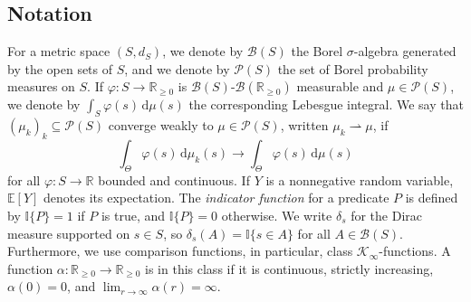 \documentclass[letterpaper, 10 pt, conference]{IEEEconf}  %
\newcommand{\R}{\mathbb{R}} %
\newcommand{\Rnn}{\mathbb{R}_{\geq 0}} %
\newcommand{\Indicator}[1]{\mathbb{I}\{{#1}\}}
\newcommand{\Borel}{\mathcal{B}} %
\newcommand{\Pbs}{\mathcal{P}} %
\newcommand{\E}{\mathbb{E}} %
\newcommand{\diff}{\, \mathrm{d}} %
\newcommand{\cKi}{\mathcal{K}_\infty} %
\theoremstyle{theorem}
\theoremstyle{definition}
\theoremstyle{remark}
\begin{document}
\subsection{Notation}
For a metric space $(S,d_S)$, we denote by $\Borel(S)$ the Borel $\sigma$-algebra generated by the open sets of $S$,
and we denote by $\Pbs(S)$ the set of Borel probability measures on $S$.
If $\varphi \colon S \rightarrow \Rnn$ is $\Borel(S)$-$\Borel(\Rnn)$ measurable and $\mu \in \Pbs(S)$, we denote by $\int_S \varphi(s) \diff \mu(s)$ the corresponding Lebesgue integral.
We say that $(\mu_k)_k\subseteq\Pbs(S)$ converge weakly to $\mu\in\Pbs(S)$, written $\mu_k \rightharpoonup \mu$, if
\begin{equation*}
    \int_\Theta \varphi(s) \diff \mu_k(s) \rightarrow \int_\Theta \varphi(s) \diff \mu(s)
\end{equation*}
for all $\varphi \colon S\rightarrow\R$ bounded and continuous.
If $Y$ is a nonnegative random variable, $\E[Y]$ denotes its expectation.
The \emph{indicator function} for a predicate $P$ is defined by
$\Indicator{P}=1$ if $P$ is true, and $\Indicator{P}=0$ otherwise.
We write $\delta_s$ for the Dirac measure supported on $s\in S$, so $\delta_s(A)=\Indicator{s\in A}$ for all $A\in\Borel(S)$.
Furthermore, we use comparison functions, in particular, class $\cKi$-functions.
A function $\alpha \colon \Rnn\rightarrow\Rnn$ is in this class if it is continuous, strictly increasing, $\alpha(0)=0$, and $\lim_{r\rightarrow\infty} \alpha(r)=\infty$.
\end{document}
